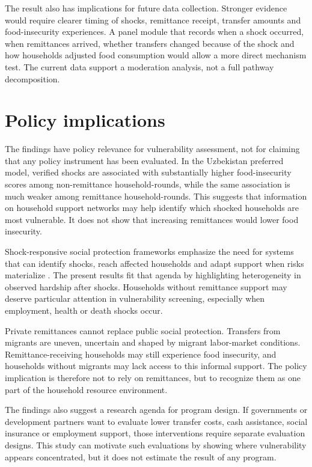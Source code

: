 \documentclass[11pt]{article}
\begin{document}
The result also has implications for future data collection. Stronger evidence would require clearer timing of shocks, remittance receipt, transfer amounts and food-insecurity experiences. A panel module that records when a shock occurred, when remittances arrived, whether transfers changed because of the shock and how households adjusted food consumption would allow a more direct mechanism test. The current data support a moderation analysis, not a full pathway decomposition.

\section{Policy implications}

The findings have policy relevance for vulnerability assessment, not for claiming that any policy instrument has been evaluated. In the Uzbekistan preferred model, verified shocks are associated with substantially higher food-insecurity scores among non-remittance household-rounds, while the same association is much weaker among remittance household-rounds. This suggests that information on household support networks may help identify which shocked households are most vulnerable. It does not show that increasing remittances would lower food insecurity.

Shock-responsive social protection frameworks emphasize the need for systems that can identify shocks, reach affected households and adapt support when risks materialize \parencite{OBrien2018,Bowen2020}. The present results fit that agenda by highlighting heterogeneity in observed hardship after shocks. Households without remittance support may deserve particular attention in vulnerability screening, especially when employment, health or death shocks occur.

Private remittances cannot replace public social protection. Transfers from migrants are uneven, uncertain and shaped by migrant labor-market conditions. Remittance-receiving households may still experience food insecurity, and households without migrants may lack access to this informal support. The policy implication is therefore not to rely on remittances, but to recognize them as one part of the household resource environment.

The findings also suggest a research agenda for program design. If governments or development partners want to evaluate lower transfer costs, cash assistance, social insurance or employment support, those interventions require separate evaluation designs. This study can motivate such evaluations by showing where vulnerability appears concentrated, but it does not estimate the result of any program.
\end{document}
